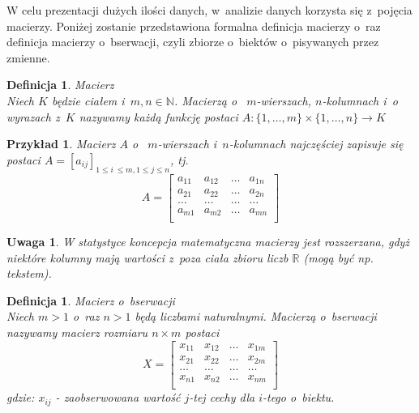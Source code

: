 \documentclass[12pt,a4paper]{report}
\newtheorem{definition}[theorem]{Definicja}
\newtheorem{uwaga}{Uwaga}
\newtheorem{example}{Przykład}
\begin{document}
W celu prezentacji dużych ilości danych, w~analizie danych korzysta się z~pojęcia macierzy. Poniżej zostanie przedstawiona formalna definicja macierzy o~raz definicja macierzy o~bserwacji, czyli zbiorze o~biektów o~pisywanych przez zmienne. %

\begin{definition}{Macierz \cite[Rozdział 1]{banaszak2002}}\\
Niech $K$ będzie ciałem i~$m, n \in \mathbb{N}$. Macierzą o~ $m$-wierszach, $n$-kolumnach i~o wyrazach z~$K$ nazywamy każdą funkcję postaci
$A: \{1,\ldots, m \} \times \{1, \ldots, n\} \rightarrow K$
\end{definition}

\begin{example}
Macierz $A$ o~ $m$-wierszach i~$n$-kolumnach najczęściej zapisuje się postaci $A=[a_{ij}]_{1\leq i~\leq m,  1\leq j\leq n}$, tj. 
$$
A= \begin{bmatrix}
a_{11} & a_{12} & \ldots & a_{1n} \\
a_{21} & a_{22} & \ldots & a_{2n}\\ 
\ldots & \ldots & \ldots & \ldots\\
a_{m1} & a_{m2} & \ldots & a_{mn} \\
\end{bmatrix}    
$$
\end{example}

\begin{uwaga}
W statystyce koncepcja matematyczna macierzy jest rozszerzana, gdyż niektóre kolumny mają wartości z~poza ciała zbioru liczb $\mathbb{R}$ (mogą być np. tekstem).
\end{uwaga}

\begin{definition}{Macierz o~bserwacji \cite[Rozdział 2]{mlodak2006}}\\
Niech $m>1$ o~raz $n>1$ będą liczbami naturalnymi.  Macierzą o~bserwacji nazywamy macierz rozmiaru  $n \times m$  postaci
$$
X= \begin{bmatrix}
x_{11} & x_{12} & \ldots & x_{1m} \\
x_{21} & x_{22} & \ldots & x_{2m}\\
\ldots & \ldots & \ldots & \ldots \\
x_{n1} & x_{n2} & \ldots & x_{nm}\\
\end{bmatrix}
$$
gdzie:
$x_{ij}$ - zaobserwowana wartość $j$-tej cechy dla $i$-tego o~biektu.
\end{definition}
\end{document}

